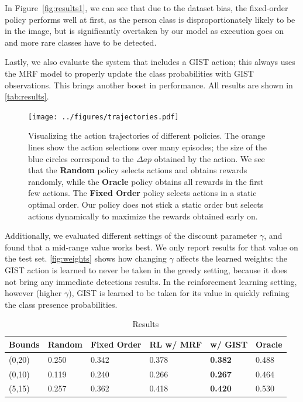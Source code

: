 In Figure~\autoref{fig:results1}, we can see that due to the dataset bias, the fixed-order policy performs well at first, as the person class is disproportionately likely to be in the image, but is significantly overtaken by our model as execution goes on and more rare classes have to be detected.

Lastly, we also evaluate the system that includes a GIST action; this always uses the MRF model to properly update the class probabilities with GIST observations.
This brings another boost in performance.
All results are shown in \autoref{tab:results}.

\begin{figure}[h!]
  \centering
  \texttt{[image: ../figures/trajectories.pdf]}
  \caption{
Visualizing the action trajectories of different policies.
The orange lines show the action selections over many episodes; the size of the blue circles correspond to the $\Delta ap$ obtained by the action.
We see that the \textbf{Random} policy selects actions and obtains rewards randomly, while the \textbf{Oracle} policy obtains all rewards in the first few actions.
The \textbf{Fixed Order} policy selects actions in a static optimal order.
Our policy does not stick a static order but selects actions dynamically to maximize the rewards obtained early on.
}
  \label{fig:trajectories}
\end{figure}

Additionally, we evaluated different settings of the discount parameter $\gamma$, and found that a mid-range value works best.
We only report results for that value on the test set.
\autoref{fig:weights} shows how changing $\gamma$ affects the learned weights: the GIST action is learned to never be taken in the greedy setting, because it does not bring any immediate detections results.
In the reinforcement learning setting, however (higher $\gamma$), GIST is learned to be taken for its value in quickly refining the class presence probabilities.

\begin{table}[t]
\caption{Results}
\label{tab:results}
\begin{center}
\begin{tabular}{|l|l|l|l|l|l|}
\hline
Bounds & Random & Fixed Order & RL w/ MRF & w/ GIST         & Oracle \\ \hline
(0,20) & 0.250  & 0.342       & 0.378     & \textbf{0.382}  & 0.488 \\ 
(0,10) & 0.119  & 0.240       & 0.266     & \textbf{0.267}  & 0.464 \\ 
(5,15) & 0.257  & 0.362       & 0.418     & \textbf{0.420}  & 0.530 \\ \hline
\end{tabular}
\end{center}
\end{table}

